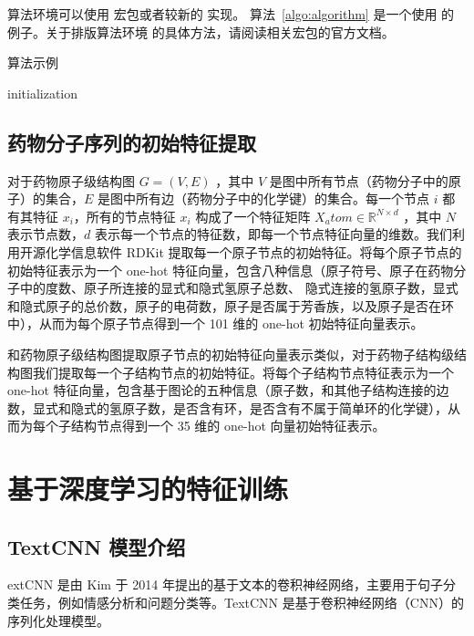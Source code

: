 算法环境可以使用  宏包或者较新的  实现。
算法~\ref{algo:algorithm} 是一个使用  的例子。关于排版算法环境
的具体方法，请阅读相关宏包的官方文档。

\begin{algorithm}[!htbp]
  \caption{算法示例}
  \label{alg:1}
  \small
  \SetAlgoLined

  initialization\;
\end{algorithm}

\subsection{药物分子序列的初始特征提取} \label{5.3.3}
对于药物原子级结构图 $G=(V,E)$ ，其中 $V$ 是图中所有节点（药物分子中的原子）的集合，$E$ 是图中所有边（药物分子中的化学键）的集合。每一个节点 $i$ 都有其特征 $x_i$，所有的节点特征 $x_i$ 构成了一个特征矩阵 $X_atom \in \mathbb{R}^{N \times d}$ ，其中 $N$ 表示节点数，$d$ 表示每一个节点的特征数，即每一个节点特征向量的维数。我们利用开源化学信息软件 RDKit 提取每一个原子节点的初始特征。将每个原子节点的初始特征表示为一个 one-hot 特征向量，包含八种信息（原子符号、原子在药物分子中的度数、原子所连接的显式和隐式氢原子总数、 隐式连接的氢原子数，显式和隐式原子的总价数，原子的电荷数，原子是否属于芳香族，以及原子是否在环中），从而为每个原子节点得到一个 101 维的 one-hot 初始特征向量表示。 

和药物原子级结构图提取原子节点的初始特征向量表示类似，对于药物子结构级结构图我们提取每一个子结构节点的初始特征。将每个子结构节点特征表示为一个 one-hot 特征向量，包含基于图论的五种信息（原子数，和其他子结构连接的边数，显式和隐式的氢原子数，是否含有环，是否含有不属于简单环的化学键），从而为每个子结构节点得到一个 35 维的 one-hot 向量初始特征表示。

\section{基于深度学习的特征训练}
\subsection{TextCNN 模型介绍}
extCNN \cite{chen2015convolutional} 是由 Kim 于 2014 年提出的基于文本的卷积神经网络，主要用于句子分类任务，例如情感分析和问题分类等。TextCNN 是基于卷积神经网络（CNN）的序列化处理模型。

